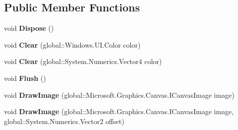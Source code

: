 \subsection*{Public Member Functions}
\begin{DoxyCompactItemize}
\item 
\mbox{\label{class_microsoft_1_1_graphics_1_1_canvas_1_1_canvas_drawing_session_aa8795057edb6c38039ac437607c927b7}} 
void {\bfseries Dispose} ()
\item 
\mbox{\label{class_microsoft_1_1_graphics_1_1_canvas_1_1_canvas_drawing_session_ac5a71fe9735b4f08bc3895d80a30f11b}} 
void {\bfseries Clear} (global\+::\+Windows.\+U\+I.\+Color color)
\item 
\mbox{\label{class_microsoft_1_1_graphics_1_1_canvas_1_1_canvas_drawing_session_a0c1fe6c1a57f8b914956b26492229f33}} 
void {\bfseries Clear} (global\+::\+System.\+Numerics.\+Vector4 color)
\item 
\mbox{\label{class_microsoft_1_1_graphics_1_1_canvas_1_1_canvas_drawing_session_aa73abd2814515b3c01931aee8baf7995}} 
void {\bfseries Flush} ()
\item 
\mbox{\label{class_microsoft_1_1_graphics_1_1_canvas_1_1_canvas_drawing_session_acc7aeb2a0829a9f83508ee320cb32e17}} 
void {\bfseries Draw\+Image} (global\+::\+Microsoft.\+Graphics.\+Canvas.\+I\+Canvas\+Image image)
\item 
\mbox{\label{class_microsoft_1_1_graphics_1_1_canvas_1_1_canvas_drawing_session_a5ea40c57c8feef90c31ff91d3e136b95}} 
void {\bfseries Draw\+Image} (global\+::\+Microsoft.\+Graphics.\+Canvas.\+I\+Canvas\+Image image, global\+::\+System.\+Numerics.\+Vector2 offset)
\item 
\mbox{\label{class_microsoft_1_1_graphics_1_1_canvas_1_1_canvas_drawing_session_a8823e29fc6dd5003f7638c113c7cc318}} 

\end{DoxyCompactItemize}
